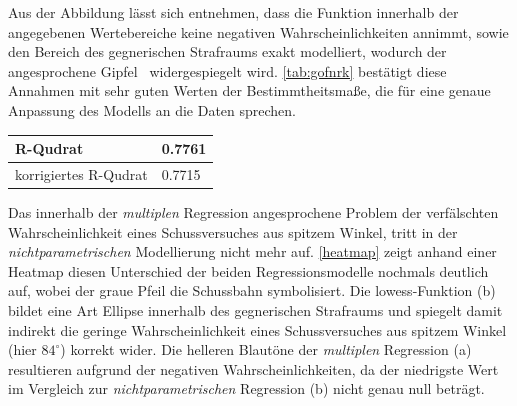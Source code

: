 Aus der Abbildung lässt sich entnehmen, dass die Funktion innerhalb der angegebenen Wertebereiche keine negativen Wahrscheinlichkeiten annimmt, sowie den Bereich des gegnerischen Strafraums exakt modelliert, wodurch der angesprochene \glqq Gipfel\grqq~ widergespiegelt wird. \vref{tab:gofnrk} bestätigt diese Annahmen mit sehr guten Werten der Bestimmtheitsmaße, die für eine genaue Anpassung des Modells an die Daten sprechen.

\tablehead{}
\tabletail{}
\tablelasttail{}
\begin{center}%
\begin{supertabular}{ | P{6cm} | P{3cm}  |}
\textsf{R-Qudrat} 	& 0.7761	\\
\hline
\textsf{korrigiertes R-Qudrat} 	&  0.7715	\\
\hline
\end{supertabular}
\end{center}

Das innerhalb der \textit{multiplen} Regression angesprochene Problem der verfälschten Wahrscheinlichkeit eines Schussversuches aus spitzem Winkel, tritt in der \textit{nichtparametrischen} Modellierung nicht mehr auf. \vref{heatmap} zeigt anhand einer Heatmap diesen Unterschied der beiden Regressionsmodelle nochmals deutlich auf, wobei der graue Pfeil die Schussbahn symbolisiert. Die \gls{lowess}-Funktion (b) bildet eine Art Ellipse innerhalb des gegnerischen Strafraums und spiegelt damit indirekt die geringe Wahrscheinlichkeit eines Schussversuches aus spitzem Winkel (hier $84^\circ$) korrekt wider. Die helleren Blautöne der \textit{multiplen} Regression (a) resultieren aufgrund der negativen Wahrscheinlichkeiten, da der niedrigste Wert im Vergleich zur \textit{nichtparametrischen} Regression (b) nicht genau null beträgt.

